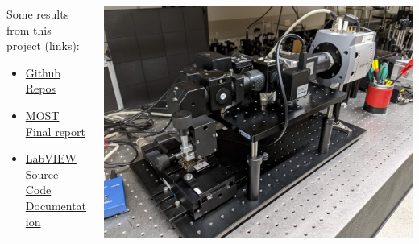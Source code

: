 \documentclass[compress, aspectratio=32]{beamer}
\begin{document}
\begin{frame}
    \begin{columns}
        \begin{column}{0.4\linewidth}
            Some results from this project (links):
            \begin{itemize}
                \item \href{https://github.com/HyperSpectral-Imaging}{Github Repos}
                \item \href{https://github.com/HyperSpectral-Imaging/HSI-docs/raw/main/final.pdf}{MOST Final report}
                \item \href{https://cheng-posheng.gitbook.io/hsi-main-project-api-documentation/}{LabVIEW Source Code Documentation}
            \end{itemize}
        \end{column}
        \begin{column}{0.6\linewidth}
            \includegraphics[width=\linewidth]{microSystemPixel3.jpg}
        \end{column}
    \end{columns}
\end{frame}
\end{document}
